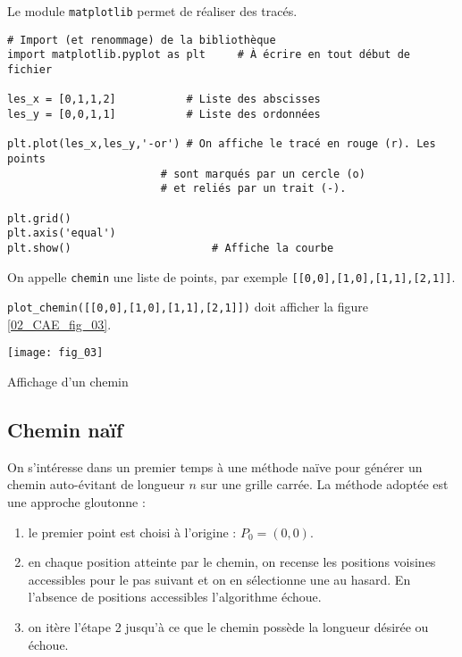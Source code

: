 Le module \lstinline{matplotlib} permet de réaliser des tracés. 


\begin{lstlisting}
# Import (et renommage) de la bibliothèque 
import matplotlib.pyplot as plt		# À écrire en tout début de fichier

les_x = [0,1,1,2]			# Liste des abscisses
les_y = [0,0,1,1]			# Liste des ordonnées

plt.plot(les_x,les_y,'-or')	# On affiche le tracé en rouge (r). Les points 
						# sont marqués par un cercle (o) 
						# et reliés par un trait (-). 

plt.grid()
plt.axis('equal')
plt.show() 						# Affiche la courbe

\end{lstlisting}


On appelle \lstinline{chemin} une liste de points, par exemple \lstinline{[[0,0],[1,0],[1,1],[2,1]]}.




\begin{test}
\lstinline{plot_chemin([[0,0],[1,0],[1,1],[2,1]])} doit afficher la figure \ref{02_CAE_fig_03}.
\end{test}


\begin{marginfigure}
\texttt{[image: fig\_03]}
\caption{Affichage d'un chemin \label{02_CAE_fig_03}}
\end{marginfigure}





\subsection*{Chemin naïf} 


On s’intéresse dans un premier temps à une méthode naïve pour générer un chemin auto-évitant de longueur
$n$ sur une grille carrée. La méthode adoptée est une approche gloutonne :
\begin{enumerate}
\item le premier point est choisi à l’origine : $P_0 = \left(0, 0\right)$.
\item en chaque position atteinte par le chemin, on recense les positions voisines accessibles pour le pas
suivant et on en sélectionne une au hasard. En l’absence de positions accessibles l’algorithme échoue.
\item on itère l’étape 2 jusqu’à ce que le chemin possède la longueur désirée ou échoue.
\end{enumerate}





